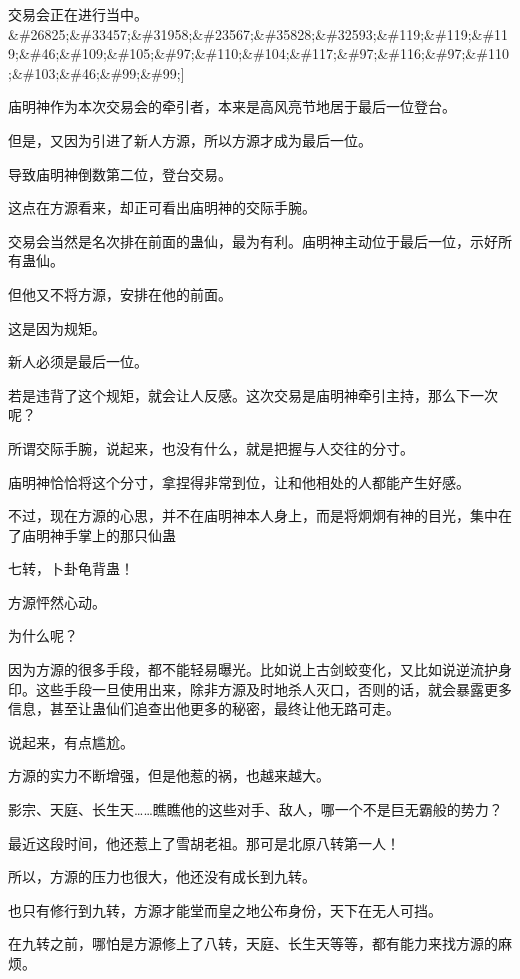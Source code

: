 
\begin{this_body}

交易会正在进行当中。\&\#26825;\&\#33457;\&\#31958;\&\#23567;\&\#35828;\&\#32593;\&\#119;\&\#119;\&\#119;\&\#46;\&\#109;\&\#105;\&\#97;\&\#110;\&\#104;\&\#117;\&\#97;\&\#116;\&\#97;\&\#110;\&\#103;\&\#46;\&\#99;\&\#99;]

庙明神作为本次交易会的牵引者，本来是高风亮节地居于最后一位登台。

但是，又因为引进了新人方源，所以方源才成为最后一位。

导致庙明神倒数第二位，登台交易。

这点在方源看来，却正可看出庙明神的交际手腕。

交易会当然是名次排在前面的蛊仙，最为有利。庙明神主动位于最后一位，示好所有蛊仙。

但他又不将方源，安排在他的前面。

这是因为规矩。

新人必须是最后一位。

若是违背了这个规矩，就会让人反感。这次交易是庙明神牵引主持，那么下一次呢？

所谓交际手腕，说起来，也没有什么，就是把握与人交往的分寸。

庙明神恰恰将这个分寸，拿捏得非常到位，让和他相处的人都能产生好感。

不过，现在方源的心思，并不在庙明神本人身上，而是将炯炯有神的目光，集中在了庙明神手掌上的那只仙蛊

七转，卜卦龟背蛊！

方源怦然心动。

为什么呢？

因为方源的很多手段，都不能轻易曝光。比如说上古剑蛟变化，又比如说逆流护身印。这些手段一旦使用出来，除非方源及时地杀人灭口，否则的话，就会暴露更多信息，甚至让蛊仙们追查出他更多的秘密，最终让他无路可走。

说起来，有点尴尬。

方源的实力不断增强，但是他惹的祸，也越来越大。

影宗、天庭、长生天……瞧瞧他的这些对手、敌人，哪一个不是巨无霸般的势力？

最近这段时间，他还惹上了雪胡老祖。那可是北原八转第一人！

所以，方源的压力也很大，他还没有成长到九转。

也只有修行到九转，方源才能堂而皇之地公布身份，天下在无人可挡。

在九转之前，哪怕是方源修上了八转，天庭、长生天等等，都有能力来找方源的麻烦。


\end{this_body}
